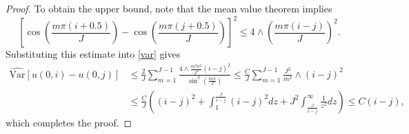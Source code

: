 \documentclass[12pt]{amsart}
\numberwithin{equation}{section}
\newcommand{\1}{\mathbf{1}}
\begin{document}
\begin{proof}
To obtain the upper bound, note that the mean value theorem implies
\begin{equation*}
    \left[\cos\left(\frac{m\pi(i+0.5)}{J}\right)-\cos\left(\frac{m\pi(j+0.5)}{J}\right)\right]^2\leq 4\wedge \left(\frac{m\pi(i-j)}{J}\right)^2.
\end{equation*}
Substituting this estimate into \eqref{var} gives
\begin{equation*}
    \begin{split}
        \widehat{\text{Var}}[u(0,i)-u(0,j)]&\leq \frac{2}{J}\sum_{m=1}^{J-1}\frac{4\wedge \frac{m^2\pi^2}{J^2}(i-j)^2}{\sin^2\left(\frac{m\pi}{J}\right)}\leq \frac{C}{J}\sum_{m=1}^{J-1}\frac{J^2}{m^2}\wedge (i-j)^2\\
        &\leq \frac{C}{J}\left((i-j)^2+\int_1^{\frac{J}{i-j}}(i-j)^2dz + J^2\int_{\frac{J}{i-j}}^\infty\frac{1}{z^2}dz\right)\leq C(i-j),
    \end{split}
\end{equation*}
which completes the proof.
\end{proof}
\end{document}

